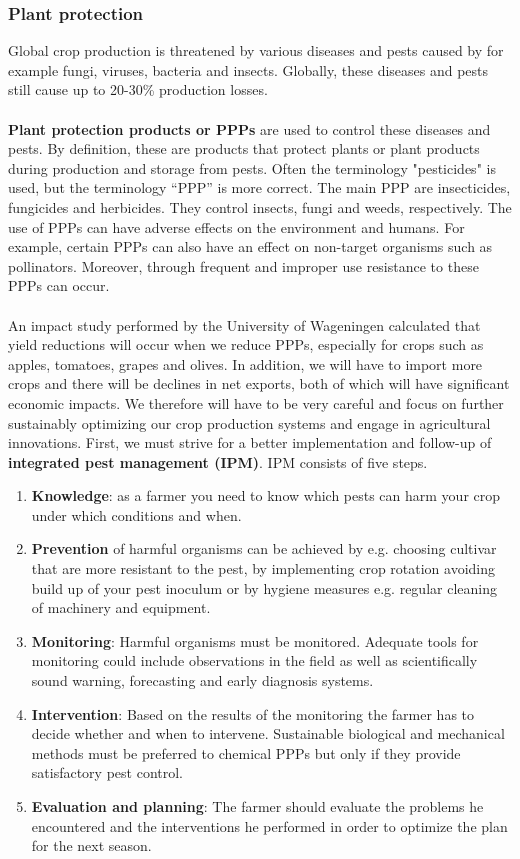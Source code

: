 \documentclass[../summary.tex]{subfiles}
\begin{document}
	\subsubsection{Plant protection}
	
	Global crop production is threatened by various diseases and pests caused by for example fungi, viruses, bacteria and insects. Globally, these diseases and pests still cause up to 20-30\% production losses. 
	\\\\
	\textbf{Plant protection products or PPPs} are used to control these diseases and pests. By definition, these are products that protect plants or plant products during production and storage from pests. Often the terminology "pesticides" is used, but the terminology “PPP” is more correct. The main PPP are insecticides, fungicides and herbicides. They control insects, fungi and weeds, respectively. The use of PPPs can have adverse effects on the environment and humans. For example, certain PPPs can also have an effect on non-target organisms such as pollinators. Moreover, through frequent and improper use resistance to these PPPs can occur. 
	\\\\
	An impact study performed by the University of Wageningen calculated that yield reductions will occur when we reduce PPPs, especially for crops such as apples, tomatoes, grapes and olives. In addition, we will have to import more crops and there will be declines in net exports, both of which will have significant economic impacts. We therefore will have to be very careful and focus on further sustainably optimizing our crop production systems and engage in agricultural innovations. First, we must strive for a better implementation and follow-up of \textbf{integrated pest management (IPM)}. IPM consists of five steps.
	
	\begin{enumerate}
		\item \textbf{ Knowledge}: as a farmer you need to know which pests can harm your crop under which conditions and when.
		\item \textbf{Prevention} of harmful organisms can be achieved by e.g. choosing cultivar that are more resistant to the pest, by implementing crop rotation avoiding build up of your pest inoculum or by hygiene measures e.g. regular cleaning of machinery and equipment.
		\item \textbf{Monitoring}: Harmful organisms must be monitored. Adequate tools for monitoring could include observations in the field as well as scientifically sound warning, forecasting and early diagnosis systems.
		\item \textbf{Intervention}: Based on the results of the monitoring the farmer has to decide whether and when to intervene. Sustainable biological and mechanical methods must be preferred to chemical PPPs but only if they provide satisfactory pest control.
		\item \textbf{Evaluation and planning}: The farmer should evaluate the problems he encountered and the interventions he performed in order to optimize the plan for the next season. 
	\end{enumerate}
	
\end{document}
